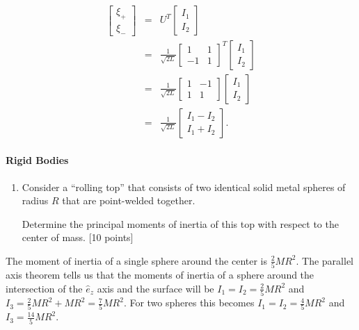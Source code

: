 \documentclass[letterpaper,11pt]{article}
\begin{document}
\begin{eqnarray*}
 \left[ \begin{array}{c} \xi_+ \\ \xi_- \end{array} \right] & = & U^T  \left[ \begin{array}{c} I_1 \\ I_2 \end{array} \right] \\
 & = & \frac{1}{\sqrt{2L}} \left[ \begin{array}{cc} 1 & 1 \\ -1 & 1 \end{array} \right]^T  \left[ \begin{array}{c} I_1 \\ I_2 \end{array} \right] \\
 & = & \frac{1}{\sqrt{2L}} \left[ \begin{array}{cc} 1 & -1 \\ 1 & 1 \end{array} \right]  \left[ \begin{array}{c} I_1 \\ I_2 \end{array} \right] \\
 & = & \frac{1}{\sqrt{2L}} \left[ \begin{array}{c} I_1 - I_2 \\ I_1 + I_2 \end{array} \right].
\end{eqnarray*}


\paragraph*{Rigid Bodies}
\begin{enumerate}[resume]
 \item Consider a ``rolling top'' that consists of two identical solid metal spheres of radius $R$ that are point-welded together.
 \begin{center}
 \end{center}
 Determine the principal moments of inertia of this top with respect to the center of mass. [10 points]
\end{enumerate}

The moment of inertia of a single sphere around the center is $\frac{2}{5} M R^2$.  The parallel axis theorem tells us that the moments of inertia of a sphere around the intersection of the $\hat{e}_z$ axis and the surface will be $I_1 = I_2 = \frac{2}{5} M R^2$ and $I_3 = \frac{2}{5} M R^2 + M R^2 = \frac{7}{5} M R^2$.  For two spheres this becomes $I_1 = I_2 = \frac{4}{5} M R^2$ and $I_3 = \frac{14}{5} M R^2$.
\end{document}
